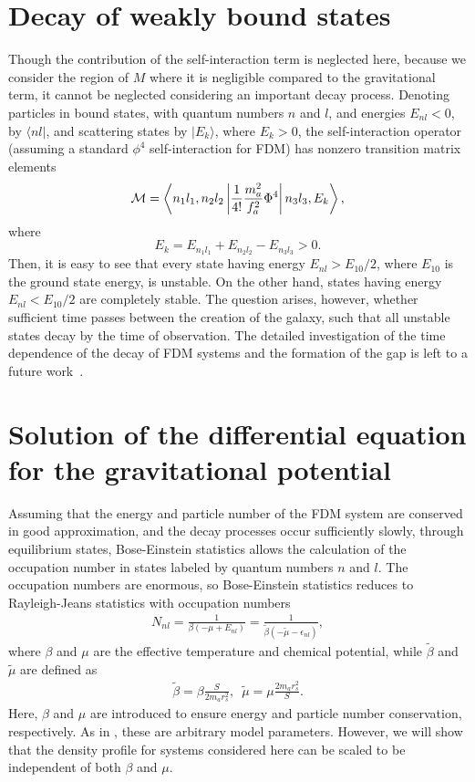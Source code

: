 \documentclass[aps,prl,twocolumn]{revtex4}
\begin{document}
\section{Decay of weakly bound states}
Though the contribution of the self-interaction term is neglected here, because we consider the region of $M$ where it is negligible compared to the gravitational term, it cannot be neglected considering an important decay process. Denoting particles in bound states, with quantum numbers $n$ and $l$, and energies $E_{nl}<0$, by $\langle n l|$, and scattering states by $|E_k\rangle$, where $E_k>0$, the self-interaction operator (assuming a standard $\phi^4$ self-interaction for FDM) has nonzero transition matrix elements
\begin{align*}
   {\cal{M}}=\left\langle n_1l_1,n_2l_2\left| \frac{1}{4!} \frac{m_a^2}{f_a^2}\Phi^4\right|n_3l_3,E_k\right\rangle,
\end{align*}
where
\begin{equation*}
    E_k=E_{n_1l_1}+ E_{n_2l_2}- E_{n_3l_3}>0.
\end{equation*}
Then, it is easy to see that every state having energy $E_{nl}>E_{10}/2$, where $E_{10}$ is the ground state energy, is unstable.  On the other hand, states having energy $E_{nl}<E_{10}/2$ are completely stable. The question arises, however, whether sufficient time passes between the creation of the galaxy,  such that all unstable states decay by the time of observation. The detailed investigation of the time dependence of the decay of FDM systems and the formation of the gap is left to a future work~\cite{SSW}.

\section{Solution of the differential equation for the gravitational potential}
Assuming that the energy and particle number of the FDM system are conserved in good approximation, and the decay processes occur sufficiently slowly, through equilibrium states, Bose-Einstein statistics allows the calculation of the occupation number in states labeled by quantum numbers $n$ and $l$. The occupation numbers are enormous, so Bose-Einstein statistics reduces to Rayleigh-Jeans statistics with occupation numbers
\begin{align*}
    N_{nl}=
  \frac{1}{\beta(-\mu+E_{nl})}=\frac{1}{\tilde\beta(-\tilde\mu-\epsilon_{nl})},
\end{align*}
where $\beta$ and $\mu$ are the effective temperature and chemical potential, while $\tilde\beta$ and $\tilde\mu$ are defined as
\begin{align*}
    \tilde\beta=\beta\frac{S}{2 m_a r_s^2},\,\,\,\tilde\mu=\mu\frac{2 m_a r_s^2}{S}.
\end{align*}
Here, $\beta$ and $\mu$ are introduced to ensure energy and particle number conservation, respectively.  As in \cite{Lin}, these are arbitrary model parameters.  However, we will show that the density profile for systems considered here can be scaled to be independent of both $\beta$ and $\mu$. 
\end{document}
